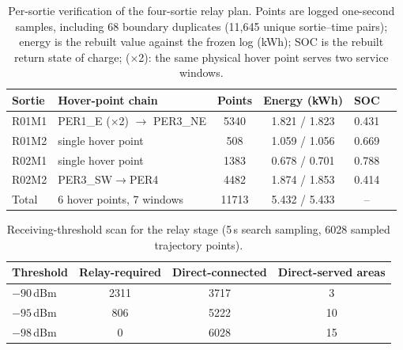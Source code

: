\documentclass[journal]{IEEEtran}
\begin{document}
\begin{table}[t]
\centering
\footnotesize
\setlength{\tabcolsep}{3pt}
\caption{Per-sortie verification of the four-sortie relay plan. Points are logged
one-second samples, including 68 boundary duplicates (11,645 unique
sortie--time pairs); energy
is the rebuilt value against the frozen log (kWh); SOC is the rebuilt return
state of charge; ($\times$2): the same
physical hover point serves two service windows.}
\label{tab:sortie}
\begin{tabular}{llcccc}
\toprule
Sortie & Hover-point chain & Points & Energy (kWh) & SOC \\
\midrule
R01M1 & PER1\_E ($\times$2) $\to$ PER3\_NE & 5340 & 1.821 / 1.823 & 0.431 \\
R01M2 & single hover point & 508 & 1.059 / 1.056 & 0.669 \\
R02M1 & single hover point & 1383 & 0.678 / 0.701 & 0.788 \\
R02M2 & PER3\_SW$\to$PER4 & 4482 & 1.874 / 1.853 & 0.414 \\
\midrule
Total & 6 hover points, 7 windows & 11713 & 5.432 / 5.433 & -- \\
\bottomrule
\end{tabular}
\end{table}

\begin{table}[t]
\centering
\footnotesize
\setlength{\tabcolsep}{3pt}
\caption{Receiving-threshold scan for the relay stage (5\,s search sampling,
6028 sampled trajectory points).}
\label{tab:threshold}
\begin{tabular}{lccc}
\toprule
Threshold & Relay-required & Direct-connected & Direct-served areas \\
\midrule
$-90$\,dBm & 2311 & 3717 & 3 \\
$-95$\,dBm & 806 & 5222 & 10 \\
$-98$\,dBm & 0 & 6028 & 15 \\
\bottomrule
\end{tabular}
\end{table}
\end{document}
